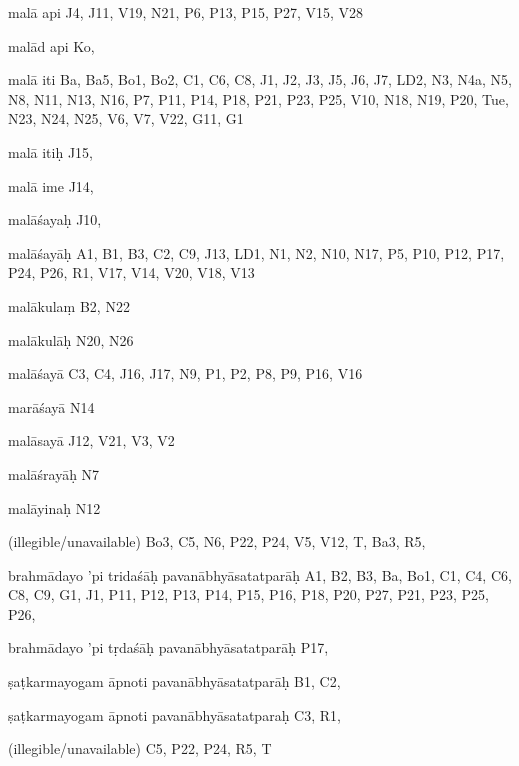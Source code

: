 \begin{ekdosis}
\begin{marma}[hp01_055]
\begin{marma}[hp02_009]
\begin{marma}[hp02_011]
\begin{marma}[hp02_38a]
\begin{description}
    \end{description}
 \end{marma}

 \begin{marma}[hp02_38b]
\item[malā api] J4, J11, V19, N21, P6, P13, P15, P27, V15, V28
\item[malād api] Ko,
\item[malā iti] Ba, Ba5, Bo1, Bo2, C1, C6, C8, J1, J2, J3, J5, J6, J7, LD2, N3, N4a, N5, N8, N11, N13, N16, P7, P11, P14, P18, P21, P23, P25, V10, N18, N19, P20, Tue, N23, N24, N25, V6, V7, V22, G11, G1
\item[malā itiḥ] J15,
\item[malā ime] J14, 
\item[malāśayaḥ] J10,
\item[malāśayāḥ] A1, B1, B3, C2, C9, J13, LD1, N1, N2, N10, N17, P5, P10, P12, P17, P24, P26, R1, V17, V14, V20, V18, V13
\item[malākulaṃ] B2, N22
\item[malākulāḥ] N20, N26
\item[malāśayā] C3, C4, J16, J17, N9, P1, P2, P8, P9, P16, V16
\item[marāśayā] N14
\item[malāsayā] J12, V21, V3, V2
\item[malāśrayāḥ] N7
\item[malāyinaḥ] N12
\item[(illegible/unavailable)] Bo3, C5, N6, P22, P24, V5, V12, T, Ba3, R5,
  \begin{description}

    \end{description}
 \end{marma}

 \begin{marma}[hp02_39ab]
\item[brahmādayo 'pi tridaśāḥ pavanābhyāsatatparāḥ] A1, B2, B3, Ba, Bo1, C1, C4, C6, C8, C9, G1, J1, P11, P12, P13, P14, P15, P16, P18, P20, P27, P21, P23, P25, P26,
\item[brahmādayo 'pi tṛdaśāḥ pavanābhyāsatatparāḥ] P17,
\item[ṣaṭkarmayogam āpnoti pavanābhyāsatatparāḥ] B1, C2, 
\item[ṣaṭkarmayogam āpnoti pavanābhyāsatatparaḥ] C3, R1,
\item[(illegible/unavailable)] C5, P22, P24, R5, T
  \begin{description}


\end{description}
\end{marma}
\end{marma}
\end{marma}
\end{marma}
\end{ekdosis}
